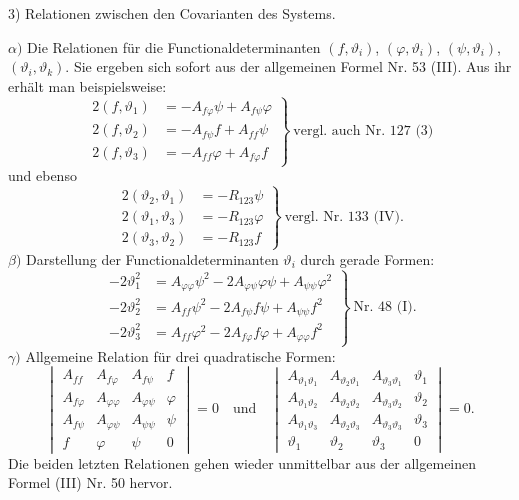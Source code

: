 \documentclass[11pt]{article}
\begin{document}
3) Relationen zwischen den Covarianten des Systems.

$\alpha)$ Die Relationen f\"ur die Functionaldeterminanten $(f,\vartheta_i)$, $(\varphi,\vartheta_i)$, $(\psi,\vartheta_i)$, $(\vartheta_i,\vartheta_k)$. Sie ergeben sich sofort aus der allgemeinen Formel Nr. 53 (III). Aus ihr erh\"alt man beispielsweise:
\[
\left.\begin{aligned}
2(f,\vartheta_1) &= -A_{f\varphi}\psi+A_{f\psi}\varphi\\
2(f,\vartheta_2) &= -A_{f\psi}f+A_{ff}\psi\\
2(f,\vartheta_3) &= -A_{ff}\varphi+A_{f\varphi}f
\end{aligned}\right\}\ \text{vergl. auch Nr. 127 (3)}
\]
und ebenso
\[
\left.\begin{aligned}
2(\vartheta_2,\vartheta_1) &= -R_{123}\psi\\
2(\vartheta_1,\vartheta_3) &= -R_{123}\varphi\\
2(\vartheta_3,\vartheta_2) &= -R_{123}f
\end{aligned}\right\}\ \text{vergl. Nr. 133 (IV).}
\]
$\beta)$ Darstellung der Functionaldeterminanten $\vartheta_i$ durch gerade Formen:
\[
\left.\begin{aligned}
-2\vartheta_1^2 &= A_{\varphi\varphi}\psi^2-2A_{\varphi\psi}\varphi\psi+A_{\psi\psi}\varphi^2\\
-2\vartheta_2^2 &= A_{ff}\psi^2-2A_{f\psi}f\psi+A_{\psi\psi}f^2\\
-2\vartheta_3^2 &= A_{ff}\varphi^2-2A_{f\varphi}f\varphi+A_{\varphi\varphi}f^2
\end{aligned}\right\}\ \text{Nr. 48 (I).}
\]
$\gamma)$ Allgemeine Relation f\"ur drei quadratische Formen:
\[
\begin{vmatrix}
A_{ff} & A_{f\varphi} & A_{f\psi} & f\\
A_{f\varphi} & A_{\varphi\varphi} & A_{\varphi\psi} & \varphi\\
A_{f\psi} & A_{\varphi\psi} & A_{\psi\psi} & \psi\\
f & \varphi & \psi & 0
\end{vmatrix}=0
\quad\text{und}\quad
\begin{vmatrix}
A_{\vartheta_1\vartheta_1} & A_{\vartheta_2\vartheta_1} & A_{\vartheta_3\vartheta_1} & \vartheta_1\\
A_{\vartheta_1\vartheta_2} & A_{\vartheta_2\vartheta_2} & A_{\vartheta_3\vartheta_2} & \vartheta_2\\
A_{\vartheta_1\vartheta_3} & A_{\vartheta_2\vartheta_3} & A_{\vartheta_3\vartheta_3} & \vartheta_3\\
\vartheta_1 & \vartheta_2 & \vartheta_3 & 0
\end{vmatrix}=0.
\]
Die beiden letzten Relationen gehen wieder unmittelbar aus der allgemeinen Formel (III) Nr. 50 hervor.
\end{document}
